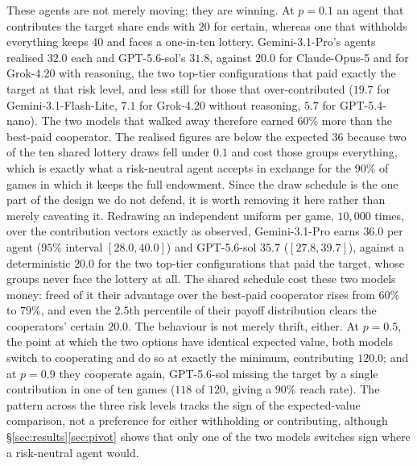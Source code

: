 \documentclass[openacc]{rsproca_new}
\begin{document}
These agents are not merely moving; they are winning. At $p=0.1$ an agent that contributes the target share ends with $20$ for certain, whereas one that withholds everything keeps $40$ and faces a one-in-ten lottery. Gemini-3.1-Pro's agents realised $32.0$ each and GPT-5.6-sol's $31.8$, against $20.0$ for Claude-Opus-5 and for Grok-4.20 with reasoning, the two top-tier configurations that paid exactly the target at that risk level, and less still for those that over-contributed ($19.7$ for Gemini-3.1-Flash-Lite, $7.1$ for Grok-4.20 without reasoning, $5.7$ for GPT-5.4-nano). The two models that walked away therefore earned $60\%$ more than the best-paid cooperator. The realised figures are below the expected $36$ because two of the ten shared lottery draws fell under $0.1$ and cost those groups everything, which is exactly what a risk-neutral agent accepts in exchange for the $90\%$ of games in which it keeps the full endowment. Since the draw schedule is the one part of the design we do not defend, it is worth removing it here rather than merely caveating it. Redrawing an independent uniform per game, $10{,}000$ times, over the contribution vectors exactly as observed, Gemini-3.1-Pro earns $36.0$ per agent ($95\%$ interval $[28.0,40.0]$) and GPT-5.6-sol $35.7$ ($[27.8,39.7]$), against a deterministic $20.0$ for the two top-tier configurations that paid the target, whose groups never face the lottery at all. The shared schedule cost these two models money: freed of it their advantage over the best-paid cooperator rises from $60\%$ to $79\%$, and even the $2.5$th percentile of their payoff distribution clears the cooperators' certain $20.0$. The behaviour is not merely thrift, either. At $p=0.5$, the point at which the two options have identical expected value, both models switch to cooperating and do so at exactly the minimum, contributing $120.0$; and at $p=0.9$ they cooperate again, GPT-5.6-sol missing the target by a single contribution in one of ten games ($118$ of $120$, giving a $90\%$ reach rate). The pattern across the three risk levels tracks the sign of the expected-value comparison, not a preference for either withholding or contributing, although \S\ref{sec:results}\ref{sec:pivot} shows that only one of the two models switches sign where a risk-neutral agent would.
\end{document}
